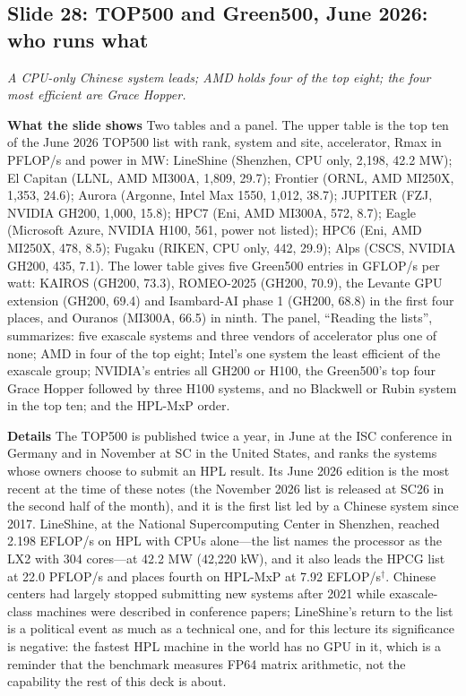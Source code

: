 \documentclass[11pt,letterpaper]{article}
\newcommand{\slide}[3]{%
  \subsection[Slide #1: #2]{Slide #1: #2}%
  {\color{muted}\itshape #3\par}\medskip}
\newcommand{\para}[1]{\medskip\noindent\textbf{#1}\quad}
\begin{document}
\slide{28}{TOP500 and Green500, June 2026: who runs what}{A CPU-only Chinese system leads; AMD holds four of the top eight; the four most efficient are Grace Hopper.}

\para{What the slide shows} Two tables and a panel. The upper table is the top ten of the June 2026 TOP500 list with rank, system and site, accelerator, Rmax in PFLOP/s and power in MW: LineShine (Shenzhen, CPU only, 2,198, 42.2 MW); El Capitan (LLNL, AMD MI300A, 1,809, 29.7); Frontier (ORNL, AMD MI250X, 1,353, 24.6); Aurora (Argonne, Intel Max 1550, 1,012, 38.7); JUPITER (FZJ, NVIDIA GH200, 1,000, 15.8); HPC7 (Eni, AMD MI300A, 572, 8.7); Eagle (Microsoft Azure, NVIDIA H100, 561, power not listed); HPC6 (Eni, AMD MI250X, 478, 8.5); Fugaku (RIKEN, CPU only, 442, 29.9); Alps (CSCS, NVIDIA GH200, 435, 7.1). The lower table gives five Green500 entries in GFLOP/s per watt: KAIROS (GH200, 73.3), ROMEO-2025 (GH200, 70.9), the Levante GPU extension (GH200, 69.4) and Isambard-AI phase 1 (GH200, 68.8) in the first four places, and Ouranos (MI300A, 66.5) in ninth. The panel, ``Reading the lists'', summarizes: five exascale systems and three vendors of accelerator plus one of none; AMD in four of the top eight; Intel's one system the least efficient of the exascale group; NVIDIA's entries all GH200 or H100, the Green500's top four Grace Hopper followed by three H100 systems, and no Blackwell or Rubin system in the top ten; and the HPL-MxP order.

\para{Details} The TOP500 is published twice a year, in June at the ISC conference in Germany and in November at SC in the United States, and ranks the systems whose owners choose to submit an HPL result. Its June 2026 edition is the most recent at the time of these notes (the November 2026 list is released at SC26 in the second half of the month), and it is the first list led by a Chinese system since 2017. LineShine, at the National Supercomputing Center in Shenzhen, reached 2.198 EFLOP/s on HPL with CPUs alone---the list names the processor as the LX2 with 304 cores---at 42.2 MW (42,220 kW), and it also leads the HPCG list at 22.0 PFLOP/s and places fourth on HPL-MxP at 7.92 EFLOP/s$^\dagger$. Chinese centers had largely stopped submitting new systems after 2021 while exascale-class machines were described in conference papers; LineShine's return to the list is a political event as much as a technical one, and for this lecture its significance is negative: the fastest HPL machine in the world has no GPU in it, which is a reminder that the benchmark measures FP64 matrix arithmetic, not the capability the rest of this deck is about.
\end{document}
